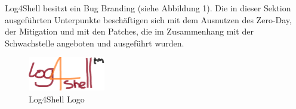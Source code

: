 
Log4Shell besitzt ein Bug Branding (siehe Abbildung 1).
Die in dieser Sektion ausgeführten Unterpunkte beschäftigen sich mit dem Ausnutzen des Zero-Day, der Mitigation und mit den Patches, die im Zusammenhang mit der Schwachstelle angeboten und ausgeführt wurden.
\begin{figure}[!htb]\label{fig:log4shell-logo}
    \begin{center}
        \includegraphics[width=0.3\textwidth]{images/log4shell-logo}
    \end{center}
    \caption{Log4Shell Logo}
\end{figure}

